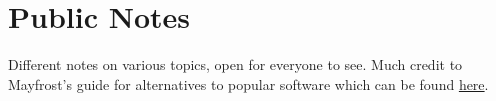 \documentclass{article}
\begin{document}
\section{Public Notes}
Different notes on various topics, open for everyone to see. Much credit to Mayfrost's guide for alternatives to popular software which can be found \href{https://github.com/mayfrost/guides/blob/master/ALTERNATIVES.md}{here}.
\end{document}
